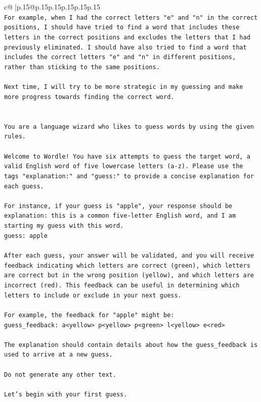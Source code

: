 \documentclass{article}
\begin{document}
{\begin{supertabular}{c@{$\;$}|p{.15\linewidth}@{}p{.15\linewidth}p{.15\linewidth}p{.15\linewidth}p{.15\linewidth}p{.15\linewidth}}
{{{\\ 
\texttt{For example, when I had the correct letters "e" and "n" in the correct positions, I should have tried to find a word that includes these letters in the correct positions and excludes the letters that I had previously eliminated. I should have also tried to find a word that includes the correct letters "e" and "n" in different positions, rather than sticking to the same positions. } \\
\\ 
\texttt{Next time, I will try to be more strategic in my guessing and make more progress towards finding the correct word.} \\
\\ 
\\ 
\texttt{You are a language wizard who likes to guess words by using the given rules.} \\
\\ 
\texttt{Welcome to Wordle! You have six attempts to guess the target word, a valid English word of five lowercase letters (a{-}z). Please use the tags "explanation:" and "guess:" to provide a concise explanation for each guess.} \\
\\ 
\texttt{For instance, if your guess is "apple", your response should be} \\
\texttt{explanation: this is a common five{-}letter English word, and I am starting my guess with this word.} \\
\texttt{guess: apple} \\
\\ 
\texttt{After each guess, your answer will be validated, and you will receive feedback indicating which letters are correct (green), which letters are correct but in the wrong position (yellow), and which letters are incorrect (red). This feedback can be useful in determining which letters to include or exclude in your next guess.} \\
\\ 
\texttt{For example, the feedback for "apple" might be:} \\
\texttt{guess\_feedback: a<yellow> p<yellow> p<green> l<yellow> e<red>} \\
\\ 
\texttt{The explanation should contain details about how the guess\_feedback is used to arrive at a new guess.} \\
\\ 
\texttt{Do not generate any other text.} \\
\\ 
\texttt{Let's begin with your first guess.} \\
            }
        }
    }
     \\ \\


\end{supertabular}}
\end{document}
